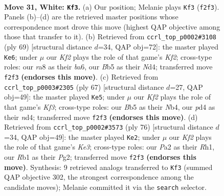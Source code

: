 \documentclass[11pt]{article}
\begin{document}
\clearpage

\begin{figure}[p]\centering
\begin{subfigure}{0.46\textwidth}\centering
\resizebox{\linewidth}{!}{%
\newchessgame
\chessboard[
  setfen={rn6/8/4N2k/1B3p1p/3p4/pP4P1/P1r2K2/1R6 w - - 4 31},
  showmover=false,
  pgfstyle=straightmove, color=movearrow, markmove={f2-f3}
]}
\caption{}
\end{subfigure}\hfill
\begin{subfigure}{0.46\textwidth}\centering
\resizebox{\linewidth}{!}{%
\newchessgame
\chessboard[
  setfen={3r4/p1R2k2/Bp4p1/4P1p1/3n4/1P5P/6P1/6K1 b - - 2 35},
  showmover=false,
  pgfstyle=straightmove, color=movearrow, markmove={f7-e6}
]}
\caption{}
\end{subfigure}
\\[4pt]
\begin{subfigure}{0.46\textwidth}\centering
\resizebox{\linewidth}{!}{%
\newchessgame
\chessboard[
  setfen={2r5/pp6/3R1kp1/P6p/1n1N4/7P/2P3P1/6K1 b - - 2 34},
  showmover=false,
  pgfstyle=straightmove, color=movearrow, markmove={f6-e5}
]}
\caption{}
\end{subfigure}\hfill
\begin{subfigure}{0.46\textwidth}\centering
\resizebox{\linewidth}{!}{%
\newchessgame
\chessboard[
  setfen={5k2/8/1p6/p2BNb2/P4P2/1nr1K1p1/6P1/7R w - - 1 39},
  showmover=false,
  pgfstyle=straightmove, color=movearrow, markmove={e3-e2}
]}
\caption{}
\end{subfigure}
\caption{\textbf{Move 31, White: \texttt{Kf3}.} (a) Our position; Melanie plays \texttt{Kf3} (\texttt{f2f3}). Panels (b)--(d) are the retrieved master positions whose correspondence most drove this move (highest QAP objective among those that transfer to it). (b) Retrieved from \texttt{ccrl\_top\_p0002\#3108} (ply 69) [structural distance $d$=34, QAP obj=72]: the master played \texttt{Ke6}; under $\mu$ our \emph{Kf2} plays the role of that game's \emph{Kf2}; cross-type roles: our \emph{r}a8 as their \emph{b}a6, our \emph{B}b5 as their \emph{N}d4; transferred move \texttt{f2f3} \textbf{(endorses this move)}. (c) Retrieved from \texttt{ccrl\_top\_p0003\#2305} (ply 67) [structural distance $d$=27, QAP obj=49]: the master played \texttt{Ke5}; under $\mu$ our \emph{Kf2} plays the role of that game's \emph{Kf3}; cross-type roles: our \emph{B}b5 as their \emph{N}b4, our \emph{p}d4 as their \emph{n}d4; transferred move \texttt{f2f3} \textbf{(endorses this move)}. (d) Retrieved from \texttt{ccrl\_top\_p0002\#3573} (ply 76) [structural distance $d$=34, QAP obj=49]: the master played \texttt{Ke2}; under $\mu$ our \emph{Kf2} plays the role of that game's \emph{Ke3}; cross-type roles: our \emph{P}a2 as their \emph{R}h1, our \emph{R}b1 as their \emph{P}g2; transferred move \texttt{f2f3} \textbf{(endorses this move)}. Synthesis: 9 retrieved analogs transferred to \texttt{Kf3} (summed QAP objective 302, the strongest correspondence among the candidate moves); Melanie committed it via the \texttt{search} selector.}
\label{fig:thought-m60}
\end{figure}
\end{document}
